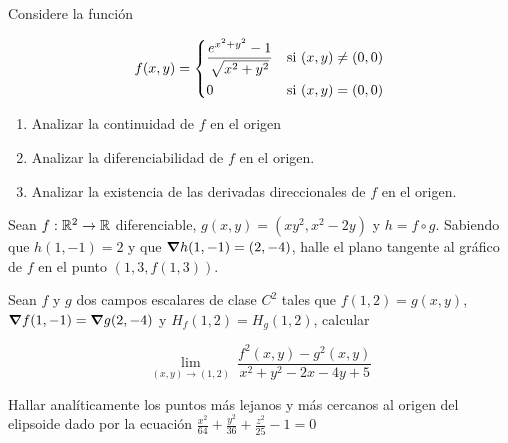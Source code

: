 
\begin{question}
    Considere la función

     \[
        f(x,y) =
        \begin{dcases}
            \frac{e^{x^{2}+y^{2}}-1}{\sqrt{x^{2}+y^{2}}} & \textnormal{si}\ (x,y) \neq (0,0) \\
            0                         & \textnormal{si}\ (x,y) = (0,0)
        \end{dcases}
    \]

    \begin{enumerate}
        \item Analizar la continuidad de $f$ en el origen
        \item Analizar la diferenciabilidad de $f$ en el origen.
        \item Analizar la existencia de las derivadas direccionales de $f$ en el origen.\\
    \end{enumerate}
\end{question}

\begin{question}
    Sean $f:\mathbb{R}^2\to\mathbb{R}$ diferenciable, $g(x,y)=(xy^2,x^2-2y)$ y $h=f\circ g$. Sabiendo que $h(1,-1) = 2$ y que $\grad h(1,-1)=(2,-4)$, halle el plano tangente al gráfico de $f$ en el punto $(1,3,f(1,3))$.
\end{question}
\begin{question}
    Sean $f$ y $g$ dos campos escalares de clase $C^2$ tales que $f(1,2)=g(x,y)$, $\grad f(1,-1)=\grad g(2,-4)$ y $H_f(1,2)=H_g(1,2)$, calcular 
    
\[
        \lim_{(x,y)\to(1,2)} \
        \frac{f^2(x,y)-g^2(x,y)}{x^2+y^2-2x-4y+5}
    \]
\end{question}
\begin{question}
    Hallar analíticamente los puntos más lejanos y más cercanos al origen del elipsoide dado por la ecuación {\large$\frac{x^2}{64}+\frac{y^2}{36}+\frac{z^2}{25}-1=0$}
\end{question}
\newpage

